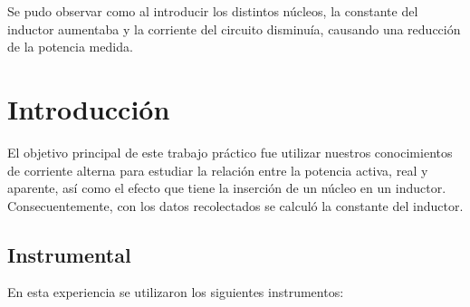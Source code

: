 \documentclass{article}
\begin{document}
    Se pudo observar como al introducir los distintos núcleos, la constante del inductor aumentaba y la corriente del
    circuito disminuía, causando una reducción de la potencia medida.

    \newpage

    \tableofcontents %
    \newpage

    \section{Introducción}

        El objetivo principal de este trabajo práctico fue utilizar nuestros conocimientos de
         corriente alterna para estudiar la relación entre la potencia activa, real y aparente, 
         así como el efecto que tiene la inserción de un núcleo en un inductor.
        Consecuentemente, con los datos recolectados se calculó la constante del inductor.

        \subsection{Instrumental}

        En esta experiencia se utilizaron los siguientes instrumentos:
\end{document}
